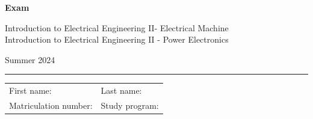 \begin{center}

    {\vspace{3mm}\Large \textbf{
    \textsf{Exam}}
    \vspace{3mm}
    
    \LARGE
    \textsf{Introduction to Electrical Engineering II- Electrical Machine \\
    Introduction to Electrical Engineering II - Power Electronics}
    
    \vspace{6mm}
    \large
    
    Summer 2024
    \vspace{5mm}
    }
    
    
\end{center}
    
    \hrule
    
    
    \vspace{5mm}
    
\begin{flushleft}
\begin{tabular}{ll}
    First name:  \qquad \qquad \qquad  \qquad \qquad\qquad \qquad \qquad & Last name: \\[1cm]
     Matriculation number: & Study program:
\end{tabular}
\end{flushleft}


